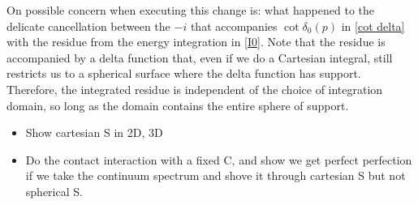 On possible concern when executing this change is: what happened to the delicate cancellation between the $-i$ that accompanies $\cot\delta_0(p)$ in \eqref{cot delta} with the residue from the energy integration in \eqref{I0}.
Note that the residue is accompanied by a delta function that, even if we do a Cartesian integral, still restricts us to a spherical surface where the delta function has support.
Therefore, the integrated residue is independent of the choice of integration domain, so long as the domain contains the entire sphere of support.

\begin{itemize}
    \item Show cartesian S in 2D, 3D
    \item Do the contact interaction with a fixed C, and show we get perfect perfection if we take the continuum spectrum and shove it through cartesian S but not spherical S.
\end{itemize}
